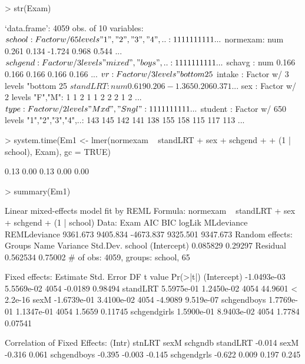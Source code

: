 \documentclass[12pt]{article}
\begin{document}
\begin{Schunk}
\begin{Sinput}
> str(Exam)
\end{Sinput}
\begin{Soutput}
`data.frame':	4059 obs. of  10 variables:
 $ school  : Factor w/ 65 levels "1","2","3","4",..: 1 1 1 1 1 1 1 1 1 1 ...
 $ normexam: num   0.261  0.134 -1.724  0.968  0.544 ...
 $ schgend : Factor w/ 3 levels "mixed","boys",..: 1 1 1 1 1 1 1 1 1 1 ...
 $ schavg  : num  0.166 0.166 0.166 0.166 0.166 ...
 $ vr      : Factor w/ 3 levels "bottom 25%","mid 50%",..: 2 2 2 2 2 2 2 2 2 2 ...
 $ intake  : Factor w/ 3 levels "bottom 25%","mid 50%",..: 1 2 3 2 2 1 3 2 2 3 ...
 $ standLRT: num   0.619  0.206 -1.365  0.206  0.371 ...
 $ sex     : Factor w/ 2 levels "F","M": 1 1 2 1 1 2 2 2 1 2 ...
 $ type    : Factor w/ 2 levels "Mxd","Sngl": 1 1 1 1 1 1 1 1 1 1 ...
 $ student : Factor w/ 650 levels "1","2","3","4",..: 143 145 142 141 138 155 158 115 117 113 ...
\end{Soutput}
\begin{Sinput}
> system.time(Em1 <- lmer(normexam ~ standLRT + sex + schgend + 
+     (1 | school), Exam), gc = TRUE)
\end{Sinput}
\begin{Soutput}
[1] 0.13 0.00 0.13 0.00 0.00
\end{Soutput}
\begin{Sinput}
> summary(Em1)
\end{Sinput}
\begin{Soutput}
Linear mixed-effects model fit by REML
Formula: normexam ~ standLRT + sex + schgend + (1 | school) 
   Data: Exam 
      AIC      BIC    logLik MLdeviance REMLdeviance
 9361.673 9405.834 -4673.837   9325.501     9347.673
Random effects:
 Groups   Name        Variance Std.Dev.
 school   (Intercept) 0.085829 0.29297 
 Residual             0.562534 0.75002 
# of obs: 4059, groups: school, 65

Fixed effects:
                Estimate  Std. Error   DF t value  Pr(>|t|)
(Intercept)  -1.0493e-03  5.5569e-02 4054 -0.0189   0.98494
standLRT      5.5975e-01  1.2450e-02 4054 44.9601 < 2.2e-16
sexM         -1.6739e-01  3.4100e-02 4054 -4.9089 9.519e-07
schgendboys   1.7769e-01  1.1347e-01 4054  1.5659   0.11745
schgendgirls  1.5900e-01  8.9403e-02 4054  1.7784   0.07541

Correlation of Fixed Effects:
            (Intr) stnLRT sexM   schgndb
standLRT    -0.014                      
sexM        -0.316  0.061               
schgendboys -0.395 -0.003 -0.145        
schgendgrls -0.622  0.009  0.197  0.245 
\end{Soutput}
\end{Schunk}
\end{document}
